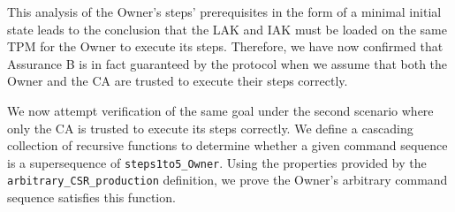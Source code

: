 \documentclass[runningheads]{llncs}
\begin{document}




This analysis of the Owner's steps' prerequisites in the form of a
minimal initial state leads to the conclusion that the LAK and IAK
must be loaded on the same TPM for the Owner to execute its
steps. 
Therefore, we have now confirmed that Assurance B is in fact guaranteed by the
protocol when we assume that both the Owner and the CA are trusted to
execute their steps correctly.


We now attempt verification of the same goal under the second scenario
where only the CA is trusted to execute its steps correctly. 
We define a cascading collection of recursive functions to determine
whether a given command sequence is a supersequence of
\verb|steps1to5_Owner|.  Using the properties provided by the
\verb|arbitrary_CSR_production| definition, we prove the Owner's
arbitrary command sequence satisfies this function.
\end{document}
